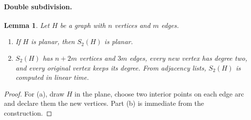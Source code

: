 \documentclass[11pt]{article}
\newtheorem{lemma}[theorem]{Lemma}
\theoremstyle{remark}
\begin{document}
\paragraph{Double subdivision.}

\begin{lemma}\label{lem:s2}
Let $H$ be a graph with $n$ vertices and $m$ edges.
\begin{enumerate}
\item[(a)] If $H$ is planar, then $S_2(H)$ is planar.
\item[(b)] $S_2(H)$ has $n+2m$ vertices and $3m$ edges, every new vertex has
degree two, and every original vertex keeps its degree. From adjacency lists,
$S_2(H)$ is computed in linear time.
\end{enumerate}
\end{lemma}

\begin{proof}
For (a), draw $H$ in the plane, choose two interior points on each edge arc
and declare them the new vertices. Part (b) is immediate from the
construction.
\end{proof}
\end{document}
